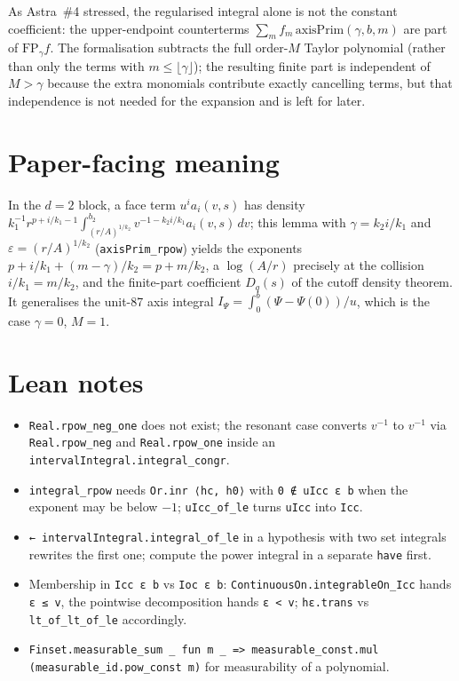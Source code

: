 \documentclass[11pt]{article}
\begin{document}
As Astra~\#4 stressed, the regularised integral alone is not the constant coefficient: the
upper-endpoint counterterms $\sum_mf_m\,\mathrm{axisPrim}(\gamma,b,m)$ are part of
$\mathrm{FP}_\gamma f$. The formalisation subtracts the full order-$M$ Taylor polynomial (rather
than only the terms with $m\le\lfloor\gamma\rfloor$); the resulting finite part is independent of
$M>\gamma$ because the extra monomials contribute exactly cancelling terms, but that independence is
not needed for the expansion and is left for later.

\section{Paper-facing meaning}

In the $d=2$ block, a face term $u^ia_i(v,s)$ has density
$k_1^{-1}r^{p+i/k_1-1}\int_{(r/A)^{1/k_2}}^{b_2}v^{-1-k_2i/k_1}a_i(v,s)\,dv$; this lemma with
$\gamma=k_2i/k_1$ and $\varepsilon=(r/A)^{1/k_2}$ (\texttt{axisPrim\_rpow}) yields the exponents
$p+i/k_1+(m-\gamma)/k_2=p+m/k_2$, a $\log(A/r)$ precisely at the collision $i/k_1=m/k_2$, and the
finite-part coefficient $D_q(s)$ of the cutoff density theorem. It generalises the unit-87 axis
integral $I_\Psi=\int_0^b(\Psi-\Psi(0))/u$, which is the case $\gamma=0$, $M=1$.

\section{Lean notes}

\begin{itemize}
\item \texttt{Real.rpow\_neg\_one} does not exist; the resonant case converts $v^{-1}$ to $v^{-1}$
via \texttt{Real.rpow\_neg} and \texttt{Real.rpow\_one} inside an
\texttt{intervalIntegral.integral\_congr}.
\item \texttt{integral\_rpow} needs \texttt{Or.inr ⟨hc, h0⟩} with \texttt{0 ∉ uIcc ε b} when the
exponent may be below $-1$; \texttt{uIcc\_of\_le} turns \texttt{uIcc} into \texttt{Icc}.
\item \texttt{← intervalIntegral.integral\_of\_le} in a hypothesis with two set integrals rewrites
the first one; compute the power integral in a separate \texttt{have} first.
\item Membership in \texttt{Icc ε b} vs \texttt{Ioc ε b}: \texttt{ContinuousOn.integrableOn\_Icc}
hands \texttt{ε ≤ v}, the pointwise decomposition hands \texttt{ε < v}; \texttt{hε.trans} vs
\texttt{lt\_of\_lt\_of\_le} accordingly.
\item \texttt{Finset.measurable\_sum \_ fun m \_ => measurable\_const.mul (measurable\_id.pow\_const m)}
for measurability of a polynomial.
\end{itemize}
\end{document}
